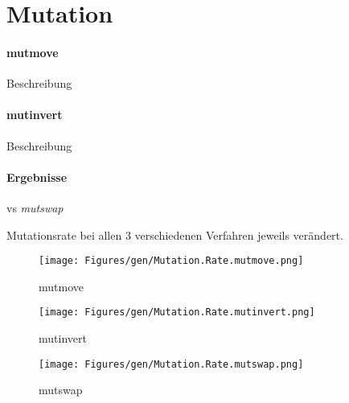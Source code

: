 \section{Mutation}\label{mutation}


\paragraph{mutmove}
Beschreibung

\paragraph{mutinvert}
Beschreibung

\paragraph{Ergebnisse}
vs \emph{mutswap}

Mutationsrate bei allen 3 verschiedenen Verfahren jeweils verändert.









\begin{figure}[!h]
  \texttt{[image: Figures/gen/Mutation.Rate.mutmove.png]}
  \caption{mutmove}\label{fig:mutmove}
\endminipage\hfill
{}
  \texttt{[image: Figures/gen/Mutation.Rate.mutinvert.png]}
  \caption{mutinvert}\label{fig:mutinvert}
\endminipage\hfill
{}%
  \texttt{[image: Figures/gen/Mutation.Rate.mutswap.png]}
  \caption{mutswap}\label{fig:mutswap}
\endminipage
\end{figure}

